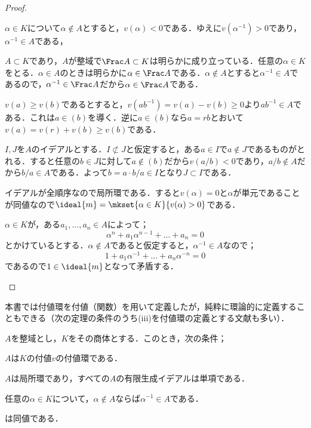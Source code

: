 \begin{proof}
	\begin{sakura}
		\item 
			$\alpha\in K$について$\alpha\not\in A$とすると，$v(\alpha)<0$である．ゆえに$v(\alpha^{-1})>0$であり，$\alpha^{-1}\in A$である，
		
		\item 
			$A\subset K$であり，$A$が整域で$\Frac A\subset K$は明らかに成り立っている．任意の$\alpha\in K$をとる．$\alpha\in A$のときは明らかに$\alpha\in\Frac A$である．$\alpha\not\in A$とすると$\alpha^{-1}\in A$であるので，$\alpha^{-1}\in\Frac A$だから$\alpha\in\Frac A$である．
		
		\item
			$v(a)\geq v(b)$であるとすると，$v(ab^{-1})=v(a)-v(b)\geq0$より$ab^{-1}\in A$である．これは$a\in (b)$を導く．逆に$a\in (b)$なら$a=rb$とおいて$v(a)=v(r)+v(b)\geq v(b)$である．
			
		\item 
			$I,J$を$A$のイデアルとする．$I\not\subset J$と仮定すると，ある$a\in I$で$a\not\in J$であるものがとれる．すると任意の$b\in J$に対して$a\not\in (b)$だから$v(a/b)<0$であり，$a/b\not\in A$だから$b/a\in A$である．よって$b=a\cdot b/a\in I$となり$J\subset I$である．
		
		\item
			イデアルが全順序なので局所環である．すると$v(\alpha)=0$と$\alpha$が単元であることが同値なので$\ideal{m}=\mkset{\alpha\in K}{v(\alpha)>0}$である．
			
		\item 
			$\alpha\in K$が，ある$a_1,\dots,a_n\in A$によって；
			\[\alpha^n+a_1\alpha^{n-1}+\dots+a_n=0\]
			とかけているとする．$\alpha\not\in A$であると仮定すると，$\alpha^{-1}\in A$なので；
			\[1+a_1\alpha^{-1}+\dots+a_n\alpha^{-n}=0\]
			であるので$1\in\ideal{m}$となって矛盾する．
	\end{sakura}
\end{proof}

本書では付値環を付値（関数）を用いて定義したが，純粋に環論的に定義することもできる（次の定理の条件のうち(iii)を付値環の定義とする文献も多い）．

\begin{thm}\label{thm:付値環の特徴づけ}
	$A$を整域とし，$K$をその商体とする．このとき，次の条件；
	\begin{sakura}
		\item $A$は$K$の付値$v$の付値環である．
		\item $A$は局所環であり，すべての$A$の有限生成イデアルは単項である．
		\item 任意の$\alpha\in K$について，$\alpha\not\in A$ならば$\alpha^{-1}\in A$である．
	\end{sakura}
	は同値である．
\end{thm}

